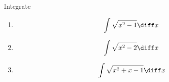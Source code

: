 Integrate
\begin{enumerate}[ref={\fcProblemRef}]
\item 
\[
\int \sqrt{x^2-1}\diff x
\]
\item 
\[
\int \sqrt{x^2-2}\diff x
\]
\item 
\[
\int \sqrt{x^2+x-1}\diff x
\]
\end{enumerate}